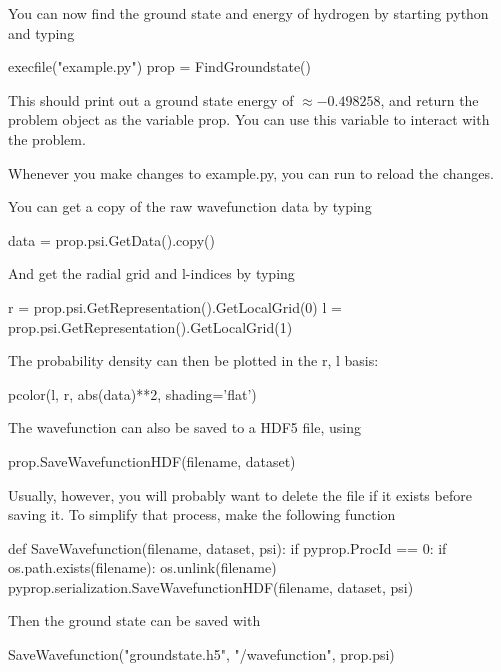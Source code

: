 You can now find the ground state and energy of hydrogen by starting python and typing
\begin{python}
	execfile("example.py")
	prop = FindGroundstate()
\end{python}
This should print out a ground state energy of $\approx -0.498258$, and return the problem object as the variable prop. You can use this variable to interact with the problem. 

Whenever you make changes to example.py, you can run  to reload the changes.

You can get a copy of the raw wavefunction data by typing
\begin{python}
	data = prop.psi.GetData().copy()
\end{python}
And get the radial grid and l-indices by typing
\begin{python}
	r = prop.psi.GetRepresentation().GetLocalGrid(0)
	l = prop.psi.GetRepresentation().GetLocalGrid(1)
\end{python}
The probability density can then be plotted in the r, l basis:
\begin{python}
	pcolor(l, r, abs(data)**2, shading='flat')
\end{python}

The wavefunction can also be saved to a HDF5 file, using 
\begin{python}
	prop.SaveWavefunctionHDF(filename, dataset) 
\end{python}
Usually, however, you will probably want to delete the file if it exists before saving it. To simplify that process, make the following function
\begin{python}
def SaveWavefunction(filename, dataset, psi):
	if pyprop.ProcId == 0:
		if os.path.exists(filename):
			os.unlink(filename)
	pyprop.serialization.SaveWavefunctionHDF(filename, dataset, psi)
\end{python}
Then the ground state can be saved with
\begin{python}
 	SaveWavefunction("groundstate.h5", "/wavefunction", prop.psi)
\end{python}


